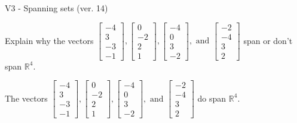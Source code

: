 \begin{exercise}
  \begin{exerciseTitle}V3 - Spanning sets (ver. 14)\end{exerciseTitle}
  \begin{exerciseStatement}
    Explain why the vectors \(\left[\begin{array}{r}
-4 \\
3 \\
-3 \\
-1
\end{array}\right] , \left[\begin{array}{r}
0 \\
-2 \\
2 \\
1
\end{array}\right] , \left[\begin{array}{r}
-4 \\
0 \\
3 \\
-2
\end{array}\right] , \text{ and } \left[\begin{array}{r}
-2 \\
-4 \\
3 \\
2
\end{array}\right]\) span or don't span \(\mathbb{R}^4\). 
	


  \end{exerciseStatement}
  \begin{exerciseAnswer}
   The vectors \(\left[\begin{array}{r}
-4 \\
3 \\
-3 \\
-1
\end{array}\right] , \left[\begin{array}{r}
0 \\
-2 \\
2 \\
1
\end{array}\right] , \left[\begin{array}{r}
-4 \\
0 \\
3 \\
-2
\end{array}\right] , \text{ and } \left[\begin{array}{r}
-2 \\
-4 \\
3 \\
2
\end{array}\right]\) 
  	 do  
	span \(\mathbb{R}^4\).
  


  \end{exerciseAnswer}
\end{exercise}